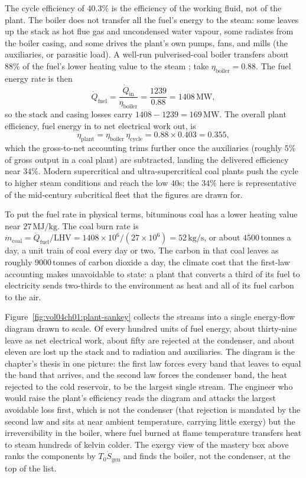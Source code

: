 The cycle efficiency of $40.3\%$ is the efficiency of the working fluid,
not of the plant. The boiler does not transfer all the fuel's energy to
the steam: some leaves up the stack as hot flue gas and uncondensed
water vapour, some radiates from the boiler casing, and some drives the
plant's own pumps, fans, and mills (the auxiliaries, or parasitic load).
A well-run pulverised-coal boiler transfers about $88\%$ of the fuel's
lower heating value to the steam \cite[ch.~10]{text:moran-shapiro-thermo};
take $\eta_{\text{boiler}} = 0.88$. The fuel energy rate is then
\[
\dot{Q}_{\text{fuel}} = \frac{\dot{Q}_{\text{in}}}{\eta_{\text{boiler}}}
  = \frac{1239}{0.88} = 1408\,\text{MW},
\]
so the stack and casing losses carry $1408 - 1239 = 169\,\text{MW}$. The
overall plant efficiency, fuel energy in to net electrical work out, is
\[
\eta_{\text{plant}} = \eta_{\text{boiler}}\,\eta_{\text{cycle}}
  = 0.88 \times 0.403 = 0.355,
\]
which the gross-to-net accounting trims further once the auxiliaries
(roughly $5\%$ of gross output in a coal plant) are subtracted, landing
the delivered efficiency near $34\%$. Modern supercritical and
ultra-supercritical coal plants push the cycle to higher steam
conditions and reach the low $40$s; the $34\%$ here is representative of
the mid-century subcritical fleet that the figures are drawn for.

To put the fuel rate in physical terms, bituminous coal has a lower
heating value near $27\,\text{MJ}/\text{kg}$. The coal burn rate is
$\dot{m}_{\text{coal}} = \dot{Q}_{\text{fuel}}/\text{LHV} =
1408 \times 10^6 / (27 \times 10^6) = 52\,\text{kg}/\text{s}$, or about
$4500\,\text{tonnes}$ a day, a unit train of coal every day or two. The
carbon in that coal leaves as roughly $9000\,\text{tonnes}$ of carbon
dioxide a day, the climate cost that the first-law accounting makes
unavoidable to state: a plant that converts a third of its fuel to
electricity sends two-thirds to the environment as heat and all of its
fuel carbon to the air.

Figure~\ref{fig:vol04ch01:plant-sankey} collects the streams into a
single energy-flow diagram drawn to scale. Of every hundred units of
fuel energy, about thirty-nine leave as net electrical work, about fifty
are rejected at the condenser, and about eleven are lost up the stack
and to radiation and auxiliaries. The diagram is the chapter's thesis in
one picture: the first law forces every band that leaves to equal the
band that arrives, and the second law forces the condenser band, the
heat rejected to the cold reservoir, to be the largest single stream.
The engineer who would raise the plant's efficiency reads the diagram
and attacks the largest avoidable loss first, which is not the
condenser (that rejection is mandated by the second law and sits at near
ambient temperature, carrying little exergy) but the irreversibility in
the boiler, where fuel burned at flame temperature transfers heat to
steam hundreds of kelvin colder. The exergy view of the mastery box
above ranks the components by $T_0 \dot{S}_{\text{gen}}$ and finds the
boiler, not the condenser, at the top of the list.

